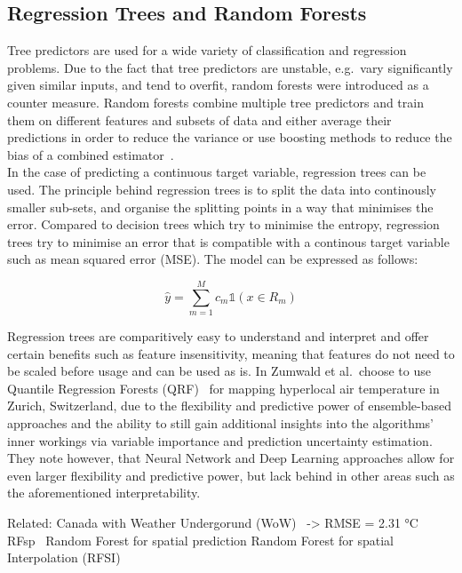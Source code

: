 \subsection{Regression Trees and Random Forests}

Tree predictors are used for a wide variety of classification and regression problems. Due to the fact that tree predictors are unstable, e.g.\ vary significantly given similar inputs, and tend to overfit, random forests were introduced as a counter measure. Random forests combine multiple tree predictors and train them on different features and subsets of data and either average their predictions in order to reduce the variance or use boosting methods to reduce the bias of a combined estimator~\cite{breiman2001random}.\\
In the case of predicting a continuous target variable, regression trees can be used. The principle behind regression trees is to split the data into continously smaller sub-sets, and organise the splitting points in a way that minimises the error. Compared to decision trees which try to minimise the entropy, regression trees try to minimise an error that is compatible with a continous target variable such as mean squared error (MSE). The model can be expressed as follows:

\begin{equation}
    \hat{y} = \sum_{m=1}^M c_m \mathbb{1}(x \in R_m)
\end{equation}

Regression trees are comparitively easy to understand and interpret and offer certain benefits such as feature insensitivity, meaning that features do not need to be scaled before usage and can be used as is. In \cite{zumwald2021mapping} Zumwald et al.\ choose to use Quantile Regression Forests (QRF)~\cite{meinshausen2006quantile} for mapping hyperlocal air temperature in Zurich, Switzerland, due to the flexibility and predictive power of ensemble-based approaches and the ability to still gain additional insights into the algorithms' inner workings via variable importance and prediction uncertainty estimation. They note however, that Neural Network and Deep Learning approaches allow for even larger flexibility and predictive power, but lack behind in other areas such as the aforementioned interpretability.

Related: Canada with Weather Undergorund (WoW)~\cite{ho2014mapping} -> RMSE = 2.31 °C
RFsp~\cite{hengl2018random} Random Forest for spatial prediction
Random Forest for spatial Interpolation (RFSI)~\cite{sekulic2020random}

